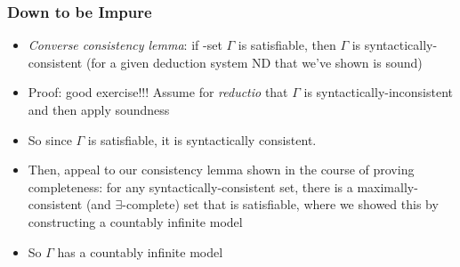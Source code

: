 \begin{frame}
\frametitle{Down to be Impure}

\begin{itemize}[<+->]

\item  \emph{Converse consistency lemma}: if -set $\Gamma$ is satisfiable, then $\Gamma$ is syntactically-consistent (for a given deduction system ND that we've shown is sound)

\item \textcolor{highlightB}{Proof: good exercise}!!! Assume for \textit{reductio} that $\Gamma$ is syntactically-inconsistent and then apply soundness

\item So since $\Gamma$ is satisfiable, it is syntactically consistent.
\item[] Then, appeal to our consistency lemma shown in the course of proving completeness: for any syntactically-consistent set, there is a maximally-consistent (and $\exists$-complete) set that is satisfiable, where we showed this by constructing a countably infinite model

\item So $\Gamma$ has a countably infinite model



\end{itemize}
\end{frame}

